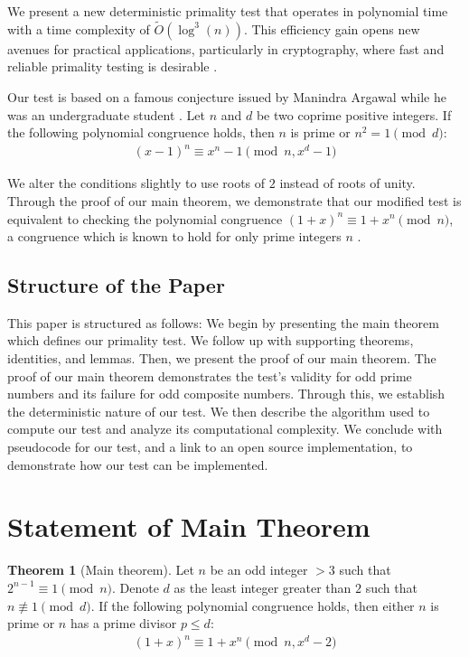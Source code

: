 \documentclass{article}
\theoremstyle{plain}
\theoremstyle{definition}
\newtheorem{theorem}{Theorem}
\begin{document}
We present a new deterministic primality test that operates in polynomial time with a time complexity of $\tilde{O}(\log^3(n))$. This efficiency gain opens new avenues for practical applications, particularly in cryptography, where fast and reliable primality testing is desirable \cite{pomerance1984}. 

Our test is based on a famous conjecture issued by Manindra Argawal while he was an undergraduate student \cite{aks2002}. Let $n$ and $d$ be two coprime positive integers. If the following polynomial congruence holds, then $n$ is prime or $n^2 = 1 \pmod{d}$:
\begin{align}
    (x - 1)^n \equiv x^n - 1 \pmod{n, x^d - 1}
\end{align}

We alter the conditions slightly to use roots of $2$ instead of roots of unity. Through the proof of our main theorem, we demonstrate that our modified test is equivalent to checking the polynomial congruence $(1 + x)^n \equiv 1 + x^n \pmod{n}$, a congruence which is known to hold for only prime integers $n$ \cite{granville2004primes}.

\subsection{Structure of the Paper}
This paper is structured as follows: We begin by presenting the main theorem which defines our primality test. We follow up with supporting theorems, identities, and lemmas. Then, we present the proof of our main theorem. The proof of our main theorem demonstrates the test's validity for odd prime numbers and its failure for odd composite numbers. Through this, we establish the deterministic nature of our test. We then describe the algorithm used to compute our test and analyze its computational complexity. We conclude with pseudocode for our test, and a link to an open source implementation, to demonstrate how our test can be implemented.

\section{Statement of Main Theorem}
\begin{theorem}[Main theorem]
\label{theorem:main}
Let $n$ be an odd integer $> 3$ such that $2^{n-1} \equiv 1 \pmod{n}$. Denote $d$ as the least integer greater than $2$ such that $n \not\equiv 1 \pmod{d}$. If the following polynomial congruence holds, then either $n$ is prime or $n$ has a prime divisor $p \leq d$:
\begin{align}
    (1 + x)^n \equiv 1 + x^n \pmod{n, x^d - 2}
\end{align}
\end{theorem}
\end{document}

